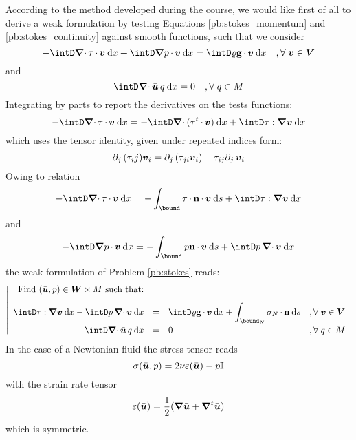 \medskip
According to the method developed during the course, we would like first of all to derive a weak formulation by testing Equations \eqref{pb:stokes_momentum} and \eqref{pb:stokes_continuity} against smooth functions, such that we consider
\begin{equation*}
- \intD \Div\Tvisc\xDot\vv\dx + \intD \Grad p \xDot \vv\dx = \intD \dens\grav\xDot\vv\dx\quad,\forany\vv\in\xVd
\end{equation*}
and
\begin{equation*}
\intD \Div\bar\uu\,q\dx = 0\quad,\forany q\in\xM
\end{equation*}
Integrating by parts to report the derivatives on the tests functions:
\begin{equation*}
- \intD \Div\Tvisc\xDot\vv\dx = - \intD \Div(\Tvisc^t\xDot\vv)\dx + \intD \Tvisc:\Grad\vv\dx
\end{equation*}
which uses the tensor identity, given under repeated indices form:
\begin{equation*}
\partial_{j}\,(\tau_ij){{\boldsymbol v}}_i = \partial_{j}\,(\tau_{ji}{{\boldsymbol v}}_i) - \tau_{ij}\partial_{j}\,{{\boldsymbol v}}_i
\end{equation*}
Owing to relation
\begin{equation*}
- \intD \Div\Tvisc\xDot\vv\dx = - \int_\bound \Tvisc\xDot\n\xDot\vv\ds + \intD \Tvisc:\Grad\vv\dx
\end{equation*}
and
\begin{equation*}
- \intD \Grad p\xDot\vv\dx = - \int_\bound p \n\xDot\vv\ds + \intD p\,\Div\vv\dx
\end{equation*}
the weak formulation of Problem \eqref{pb:stokes} reads:
\begin{equation*}\label{pb:stokes_weak}
\left\vert
\begin{array}{rlll}
\mbox{Find $(\bar\uu,p)\in \xWd\times\xM$ such that:}\\[2ex]
\displaystyle \intD \Tvisc:\Grad\vv\dx - \intD p\,\Div\vv\dx &=& \displaystyle\intD \dens\grav\xDot\vv\dx + \int_{\bound_N}\Stress_N\xDot\n\ds & ,\forany\vv\in\xVd\\[2ex]
\displaystyle \intD \Div\bar\uu\,q\dx &=& 0 & ,\forany q\in\xM
\end{array}
\right.
\end{equation*}
In the case of a Newtonian fluid the stress tensor reads
\begin{equation*}
\sigma(\bar{{{\boldsymbol u}}},p) = 2\nu\varepsilon(\bar{{{\boldsymbol u}}}) - p {\mathbf{\mathbb{I}}}
\end{equation*}
with the strain rate tensor
\begin{equation*}
\varepsilon(\bar{{{\boldsymbol u}}}) = \dfrac{1}{2}({\boldsymbol\nabla}\bar{{{\boldsymbol u}}} + {\boldsymbol\nabla}^t\bar{{{\boldsymbol u}}})
\end{equation*}
which is symmetric.

